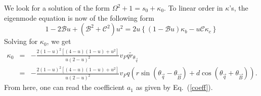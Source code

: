 \documentclass[prb,aps,twocolumn]{revtex4}
\newcommand{\beq}{\begin{equation}}
\newcommand{\eeq}{\end{equation}}
\newcommand{\bea}{\begin{eqnarray}}
\newcommand{\eea}{\end{eqnarray}}
\newcommand{\bq}{{\vec q}}
\newcommand{\bB}{{\vec B}}
\begin{document}
\begin{widetext}
We look for a solution of the form $\Omega^2+1=s_0+\kappa_0$. To
linear order in $\kappa$'s, the eigenmode equation is now of the
{following} form \beq\label{eq:modd}
1-2\mathcal{B}u+(\mathcal{B}^2+\mathcal{C}^2)u^2=2u\left\{(1-\mathcal{B}u)\kappa_b-
u\mathcal{C} \kappa_c\right\} \eeq Solving for $\kappa_0$, we get
\bea\label{eq:soll}
\kappa_0&=&-\frac{2(1-u)^2[(4-u)(1-u)+u^2]}{u(2-u)^2}v_Fq\tilde r_{\theta_\bq}\nonumber\\
&=&-\frac{2(1-u)^2[(4-u)(1-u)+u^2]}{u(2-u)^2}v_Fq
\left(r\sin(\theta_{\bq}-\theta_\bB)+d\cos(\theta_{\bq}+\theta_\bB)\right).
\eea From here, one can read the coefficient $a_1$ as given by
Eq.~(\ref{coeff}).
\end{widetext}


\end{document}

